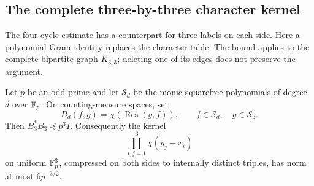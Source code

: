 \subsection{The complete three-by-three character kernel}
\label{subsec:cubic-resultant}

The four-cycle estimate has a counterpart for three labels on each
side. Here a polynomial Gram identity replaces the character table.
The bound applies to the complete bipartite graph $K_{3,3}$; deleting one of its
edges does not preserve the argument.

\begin{theorem}\label{thm:cubic-resultant}
Let $p$ be an odd prime and let $\mathcal S_d$ be the monic squarefree
polynomials of degree $d$ over $\mathbb F_p$. On counting-measure spaces, set
\[
 B_d(f,g)=\chi(\operatorname{Res}(g,f)),
 \qquad f\in\mathcal S_d,\quad g\in\mathcal S_3.
\]
Then $B_3^*B_3\preceq p^3I$. Consequently the kernel
\[
 \prod_{i,j=1}^3\chi(y_j-x_i)
\]
on uniform $\mathbb F_p^3$, compressed on both sides to internally distinct
triples, has norm at most $6p^{-3/2}$.
\end{theorem}

